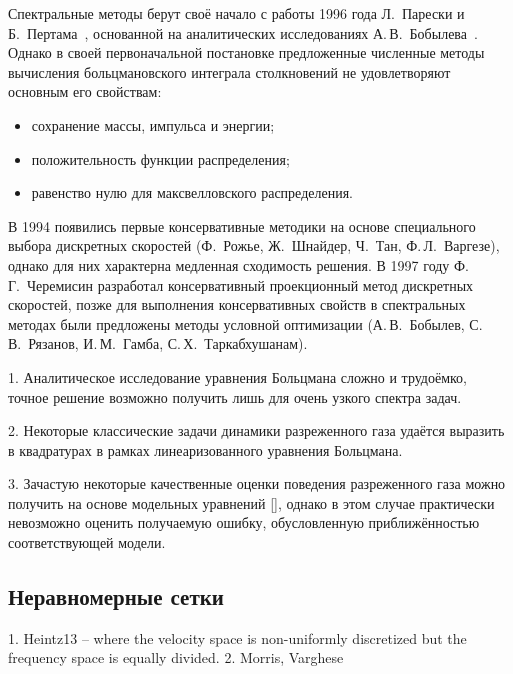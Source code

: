 Спектральные методы берут своё начало с работы 1996 года Л.~Парески и Б.~Пертама~\cite{Pareschi1996},
основанной на аналитических исследованиях А.\,В.~Бобылева~\cite{Bobylev1984}.
Однако в своей первоначальной постановке предложенные численные методы вычисления
больцмановского интеграла столкновений не удовлетворяют основным его свойствам:
\begin{itemize}
    \item сохранение массы, импульса и энергии;
    \item положительность функции распределения;
    \item равенство нулю для максвелловского распределения.
\end{itemize}
В 1994 появились первые консервативные методики на основе специального выбора
дискретных скоростей (Ф.~Рожье, Ж.~Шнайдер, Ч.~Тан, Ф.\,Л.~Варгезе),
однако для них характерна медленная сходимость решения.
В 1997 году Ф.\,Г.~Черемисин разработал консервативный проекционный метод дискретных скоростей,
позже для выполнения консервативных свойств в спектральных методах были предложены методы
условной оптимизации (А.\,В.~Бобылев, С.\,В.~Рязанов, И.\,М.~Гамба, С.\,Х.~Таркабхушанам).



1. Аналитическое исследование уравнения Больцмана сложно и трудоёмко,
точное решение возможно получить лишь для очень узкого спектра задач.

2. Некоторые классические задачи динамики разреженного газа удаётся выразить в квадратурах
в рамках линеаризованного уравнения Больцмана.

3. Зачастую некоторые качественные оценки поведения разреженного газа можно получить на основе модельных уравнений [],
однако в этом случае практически невозможно оценить получаемую ошибку, обусловленную приближённостью соответствующей модели.


\subsection{Неравномерные сетки}
1. Heintz13 -- where the velocity space is non-uniformly discretized but the frequency space is equally divided.
2. Morris, Varghese

